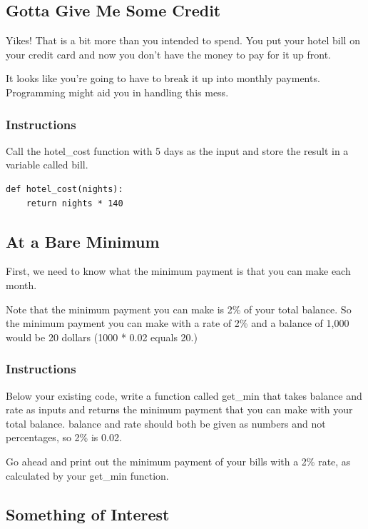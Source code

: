 \documentclass[12pt,a4paper,final,twoside,onecolumn,titlepage]{book}
\begin{document}
\subsection{Gotta Give Me Some Credit}

Yikes! That is a bit more than you intended to spend. You put your hotel bill on your credit card and now you don't have the money to pay for it up front.

It looks like you're going to have to break it up into monthly payments. Programming might aid you in handling this mess.
\subsubsection{Instructions}

Call the hotel\_cost function with 5 days as the input and store the result in a variable called bill.

\begin{lstlisting}
def hotel_cost(nights):
    return nights * 140

\end{lstlisting}

\subsection{At a Bare Minimum}

First, we need to know what the minimum payment is that you can make each month.

Note that the minimum payment you can make is 2\% of your total balance. So the minimum payment you can make with a rate of 2\% and a balance of 1,000 would be 20 dollars (1000 * 0.02 equals 20.)
\subsubsection{Instructions}

Below your existing code, write a function called get\_min that takes balance and rate as inputs and returns the minimum payment that you can make with your total balance. balance and rate should both be given as numbers and not percentages, so 2\% is 0.02.

Go ahead and print out the minimum payment of your bills with a 2\% rate, as calculated by your get\_min function.

\subsection{Something of Interest}
\end{document}
